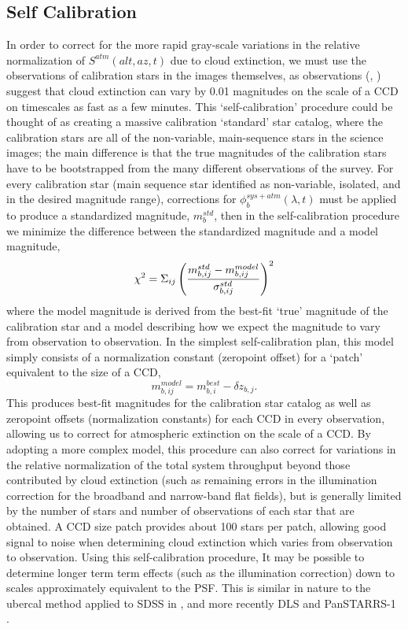 \documentclass[12pt,preprint]{aastex}
\begin{document}
\subsection{Self Calibration}
In order to correct for the more rapid gray-scale variations in the
relative normalization of $S^{atm}(alt,az,t)$ due to cloud extinction,
we must use the observations of calibration stars in the images themselves, as
 observations (\citep{Burke13}, \citep{Ivezic2007}) suggest that cloud extinction can vary by 0.01 magnitudes on the scale of a CCD
on timescales as fast as a few minutes. This
`self-calibration' procedure could be thought of as creating a massive
calibration `standard' star catalog, where the calibration stars are
all of the non-variable, main-sequence stars in the science images;
the main difference is that the true magnitudes of the calibration
stars have to be bootstrapped from the many different observations of
the survey. For every calibration star (main sequence star identified as non-variable,
isolated, and in the desired magnitude range), corrections for
 $\phi_b^{sys+atm}(\lambda,t)$ must be
applied to produce a standardized magnitude, $m_b^{std}$, then in the
self-calibration procedure we minimize the difference between the
standardized magnitude and a model magnitude,
\begin{equation}
\label{eqn:chi2}
\chi^2 = \Sigma_{ij} \left( { m_{b,ij}^{std} - m_{b,ij}^{model} \over
\sigma_{b,ij}^{std} } \right)^2
\end{equation}
where the model magnitude is derived from the best-fit `true'
magnitude of the calibration star and a model describing how we expect
the magnitude to vary from observation to observation. In the simplest
self-calibration plan, this model simply consists of a normalization constant
(zeropoint offset) for a `patch' equivalent to the size of a CCD,
\begin{equation}
\label{eqn:modelmag}
m_{b,ij}^{model} = m_{b,i}^{best} - \delta z_{b,j}.
\end{equation}
This produces best-fit magnitudes for the calibration star catalog as
well as zeropoint offsets (normalization constants) for each CCD in
every observation, allowing us to correct for atmospheric extinction
on the scale of a CCD. By adopting a more complex model, this
procedure can also correct for variations in the relative
normalization of the total system throughput beyond those contributed
by cloud extinction (such as remaining errors in the illumination
correction for the broadband and narrow-band flat fields), but is
generally limited by the number of stars and number of observations of
each star that are obtained. A CCD size patch provides about 100 stars
per patch, allowing good signal to noise when determining cloud
extinction which varies from observation to observation.  Using this
self-calibration procedure, It may be
possible to determine longer term term effects (such as the
illumination correction) down to scales approximately equivalent to
the PSF. This is similar in
nature to the ubercal method applied to SDSS in
\citet{Padmanabhan2008}, and more recently DLS \citep{Wittman} and PanSTARRS-1 \citep{xx}.
\end{document}
